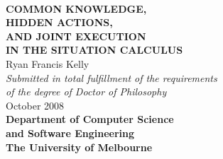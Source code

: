 %
%
%
%








\begin{titlepage}
\begin{center}
\ \\
\vspace{2cm}
{\bf\LARGE  COMMON KNOWLEDGE, }\\ \vspace{0.3cm}
{\bf\LARGE  HIDDEN ACTIONS, }\\ \vspace{0.3cm}
{\bf\LARGE  AND JOINT EXECUTION }\\ \vspace{0.5cm}
{\bf\LARGE  IN THE SITUATION CALCULUS } \\
\vspace{3cm}
{\LARGE      Ryan Francis Kelly       }\\
\vspace{5cm}
{\em\large Submitted in total fulfillment of the requirements}\\ \vspace{0.1cm}
{\em\large        of the degree of Doctor of Philosophy     }\\
\vspace{0.5cm}
{\Large             October 2008        }\\
\vspace{2.5cm}
{\bf\large Department of Computer Science\\ and Software Engineering}\\ \vspace{0.5cm}
{\bf\Large        The University of Melbourne     }\\
\vspace{0.5cm}
\end{center}
\end{titlepage}

\cleardoublepage



